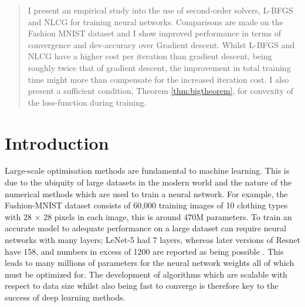 \documentclass[nohyperref]{article}
\theoremstyle{plain}
\theoremstyle{definition}
\theoremstyle{remark}
\begin{document}

\date{\today}

\begin{abstract}
I present an empirical study into the use of second-order solvers, L-BFGS and NLCG for training neural networks. Comparisons are made on the Fashion MNIST dataset and I show improved performance in terms of convergence and dev-accuracy over Gradient descent. Whilst L-BFGS and NLCG have a higher cost per iteration than gradient descent, being roughly twice that of gradient descent, the improvement in total training time might more than compensate for the increased iteration cost. I also present a sufficient condition, Theorem \ref{thm:bigtheorem}, for convexity of the loss-function during training. 

\end{abstract}

\section{Introduction}
Large-scale optimisation methods are fundamental to machine learning. This is due to the ubiquity of large datasets in the modern world and the nature of the numerical methods which are used to train a neural network.  For example, the Fashion-MNIST dataset \citep{FashionMNIST:data} consists of 60,000 training images of 10 clothing types with 28 $\times$ 28 pixels in each image, this is around 470M parameters. To train an accurate model to adequate performance on a large dataset can require neural networks with many layers; LeNet-5 \citep{LeCun:5} had 7 layers, whereas later versions of Resnet \citep{ResNet_18} have 158, and numbers in excess of 1200 are reported as being possible \citep{Huang:Stoch}. This leads to many millions of parameters for the neural network weights all of which must be optimized for. The development of algorithms which are scalable with respect to data size whilst also being fast to converge is therefore key to the success of deep learning methods.
\end{document}
